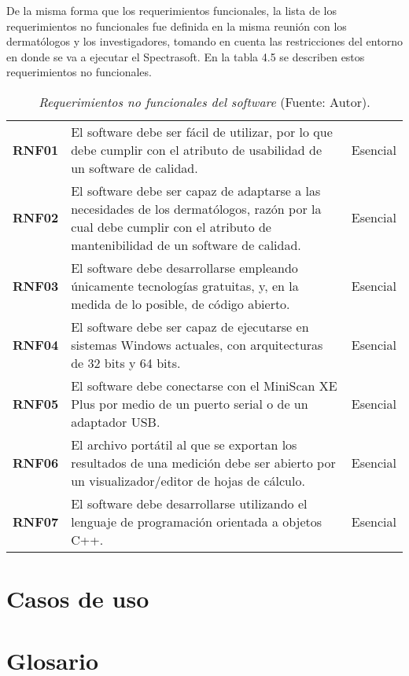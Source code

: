 	De la misma forma que los requerimientos funcionales, la lista de los requerimientos no funcionales fue definida en la misma reuni\'{o}n con los dermat\'{o}logos y los investigadores, tomando en cuenta las restricciones del entorno en donde se va a ejecutar el Spectrasoft. En la tabla 4.5 se describen estos requerimientos no funcionales.
	
	\begin{table}[h]
		\small
		\caption[Requerimientos no funcionales del software]{\textit{Requerimientos no funcionales del software} (Fuente: Autor).}
		\centering
		\setlength{\extrarowheight}{\altocelda}
		\begin{tabulary}{\anchotabla}{|c|J|c|}
			\hline
			 &  & \\ \hline
			\textbf{RNF01} & El software debe ser f\'{a}cil de utilizar, por lo que debe cumplir con el atributo de usabilidad de un software de calidad. & Esencial\\ \hline
			\textbf{RNF02} & El software debe ser capaz de adaptarse a las necesidades de los dermat\'{o}logos, raz\'{o}n por la cual debe cumplir con el atributo de mantenibilidad de un software de calidad. & Esencial\\ \hline
			\textbf{RNF03} & El software debe desarrollarse empleando \'{u}nicamente tecnolog\'{i}as gratuitas, y, en la medida de lo posible, de c\'{o}digo abierto. & Esencial\\ \hline
			\textbf{RNF04} & El software debe ser capaz de ejecutarse en sistemas Windows actuales, con arquitecturas de 32 bits y 64 bits. & Esencial\\ \hline
			\textbf{RNF05} & El software debe conectarse con el MiniScan XE Plus por medio de un puerto serial o de un adaptador USB. & Esencial\\ \hline
			\textbf{RNF06} & El archivo port\'{a}til al que se exportan los resultados de una medici\'{o}n debe ser abierto por un visualizador/editor de hojas de c\'{a}lculo. & Esencial\\ \hline
			\textbf{RNF07} & El software debe desarrollarse utilizando el lenguaje de programaci\'{o}n orientada a objetos C++. & Esencial\\ \hline
		\end{tabulary}
	\end{table}

\section{Casos de uso}

\section{Glosario}
